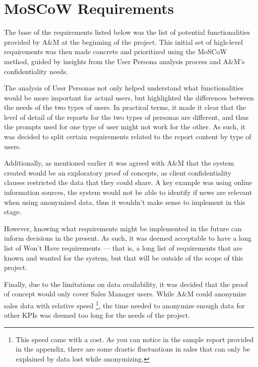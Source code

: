 \documentclass[a4paper]{report}
\begin{document}
\section{MoSCoW Requirements}


\newcommand{\frid}{FR-\arabic{frcounter}}
\newcommand{\nfrid}{NFR-\arabic{nfrcounter}}

The base of the requirements listed below was the list of potential functionalities provided by A\&M at the beginning of the project. This initial set of high-level requirements was then made concrete and prioritized using the MoSCoW method, guided by insights from the User Persona analysis process and A\&M's confidentiality needs.

The analysis of User Personas not only helped understand what functionalities would be more important for actual users, but highlighted the differences between the needs of the two types of users. In practical terms, it made it clear that the level of detail of the reports for the two types of personas are different, and thus the prompts used for one type of user might not work for the other. As such, it was decided to split certain requirements related to the report content by type of users.

Additionally, as mentioned earlier it was agreed with A\&M that the system created would be an exploratory proof of concepts, as client confidentiality clauses restricted the data that they could share. A key example was using online information sources, the system would not be able to identify if news are relevant when using anonymized data, thus it wouldn't make sense to implement in this stage.

However, knowing what requirements might be implemented in the future can inform decisions in the present. As such, it was deemed acceptable to have a long list of Won't Have requirements --- that is, a long list of requirements that are known and wanted for the system, but that will be outside of the scope of this project.

Finally, due to the limitations on data availability, it was decided that the proof of concept would only cover Sales Manager users. While A\&M could anonymize sales data with relative speed \footnote{This speed came with a cost. As you can notice in the sample report provided in the appendix, there are some drastic fluctuations in sales that can only be explained by data lost while anonymizing.}, the time needed to anonymize enough data for other KPIs was deemed too long for the needs of the project.
\end{document}
